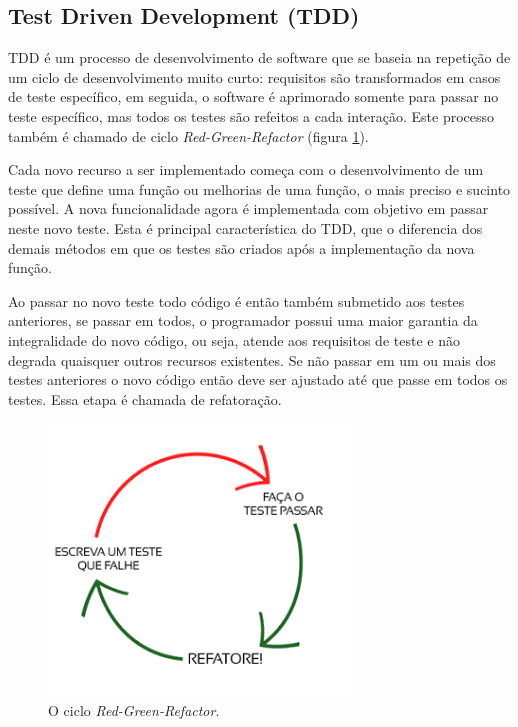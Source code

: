 \subsection{Test Driven Development (TDD)}
\par TDD é um processo de desenvolvimento de software que se baseia na repetição de um ciclo de desenvolvimento muito curto: requisitos são transformados em casos de teste específico, em seguida, o software é aprimorado somente para passar no teste específico, mas todos os testes são refeitos a cada interação. Este processo também é chamado de ciclo \emph{Red-Green-Refactor} (figura \ref{fig:red_green}).
\par Cada novo recurso a ser implementado começa com o desenvolvimento de um teste que define uma função ou melhorias de uma função, o mais preciso e sucinto possível. A nova funcionalidade agora é implementada com objetivo em passar neste novo teste. Esta é principal característica do TDD, que o diferencia dos demais métodos em que os testes são criados após a implementação da nova função.
\par Ao passar no novo teste todo código é então também submetido aos testes anteriores, se passar em todos, o programador possui uma maior garantia da integralidade do novo código, ou seja, atende aos requisitos de teste e não degrada quaisquer outros recursos existentes. Se não passar em um ou mais dos testes anteriores o novo código então deve ser ajustado até que passe em todos os testes. Essa etapa é chamada de refatoração.
\begin{figure}[!htb]
\centering
\includegraphics[width=8cm]{figuras/red_green}
\caption{\label{fig:red_green}O ciclo \emph{Red-Green-Refactor}.}
\end{figure}
